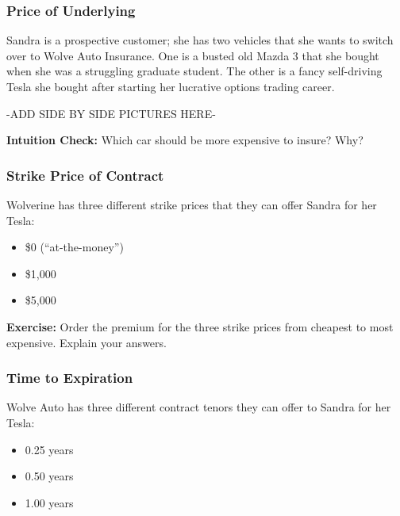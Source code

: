 \documentclass[11pt,]{krantz}
\providecommand{\tightlist}{%
  \setlength{\itemsep}{0pt}\setlength{\parskip}{0pt}}
\begin{document}
\subsubsection*{Price of Underlying}\label{price-of-underlying}

Sandra is a prospective customer; she has two vehicles that she wants to switch over to Wolve Auto Insurance. One is a busted old Mazda 3 that she bought when she was a struggling graduate student. The other is a fancy self-driving Tesla she bought after starting her lucrative options trading career.

-ADD SIDE BY SIDE PICTURES HERE-

\textbf{Intuition Check:} Which car should be more expensive to insure? Why?

\subsubsection*{Strike Price of Contract}\label{strike-price-of-contract}

Wolverine has three different strike prices that they can offer Sandra for her Tesla:

\begin{itemize}
\tightlist
\item
  \$0 (``at-the-money'')
\item
  \$1,000
\item
  \$5,000
\end{itemize}

\textbf{Exercise:} Order the premium for the three strike prices from cheapest to most expensive. Explain your answers.

\subsubsection*{Time to Expiration}\label{time-to-expiration}

Wolve Auto has three different contract tenors they can offer to Sandra for her Tesla:

\begin{itemize}
\tightlist
\item
  0.25 years
\item
  0.50 years
\item
  1.00 years
\end{itemize}
\end{document}
